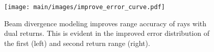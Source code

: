 \begin{figure}[t]
    \centering
        \texttt{[image: main/images/improve\_error\_curve.pdf]}
        \caption{Beam divergence modeling improves range accuracy of rays with dual returns. This is evident in the improved error distribution of the first (left) and second return range (right).}
    \label{fig:ecdf}
\end{figure}